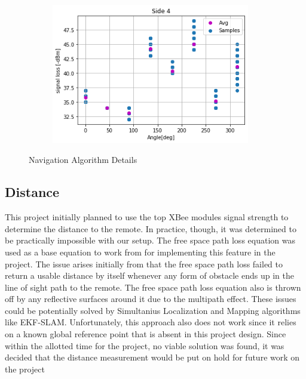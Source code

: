 \begin{figure}[H]
\begin{subfigure}{0.50\textwidth}
        \label{fig:Side3Dat}
    \end{subfigure}%
    \begin{subfigure}{0.50\textwidth}
        \centering
        \includegraphics[width=0.95\textwidth]{figs/img/Side4_Data.png}
        \label{fig:Side4Dat}
    \end{subfigure}
    \caption{Navigation Algorithm Details}
    \label{fig:SensorDataGraphs}
\end{figure}

\subsection{Distance}
This project initially planned to use the top XBee modules signal strength to determine the distance to the remote.  In practice, though, it was determined to be practically impossible with our setup.  The free space path loss equation was used as a base equation to work from for implementing this feature in the project.  The issue arises initially from that the free space path loss failed to return a usable distance by itself whenever any form of obstacle ends up in the line of sight path to the remote.  The free space path loss equation also is thrown off by any reflective surfaces around it due to the multipath effect.  These issues could be potentially solved by Simultanius Localization and Mapping algorithms like EKF-SLAM.  Unfortunately, this approach also does not work since it relies on a known global reference point that is absent in this project design. Since within the allotted time for the project, no viable solution was found, it was decided that the distance measurement would be put on hold for future work on the project



